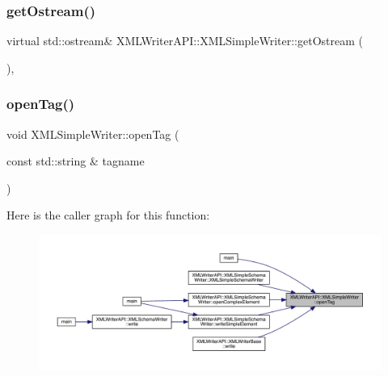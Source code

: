 \subsubsection{\texorpdfstring{getOstream()}{getOstream()}\hspace{0.1cm}{\footnotesize\ttfamily [2/2]}}
{\footnotesize\ttfamily virtual std\+::ostream\& X\+M\+L\+Writer\+A\+P\+I\+::\+X\+M\+L\+Simple\+Writer\+::get\+Ostream (\begin{DoxyParamCaption}{ }\end{DoxyParamCaption})\hspace{0.3cm}{\ttfamily [protected]}, {}}

\mbox{\label{classXMLWriterAPI_1_1XMLSimpleWriter_ac3033f799bbe8ba59bfba4f8c22a2e79}} 
\subsubsection{\texorpdfstring{openTag()}{openTag()}\hspace{0.1cm}{\footnotesize\ttfamily [1/8]}}
{\footnotesize\ttfamily void X\+M\+L\+Simple\+Writer\+::open\+Tag (\begin{DoxyParamCaption}\item[{const std\+::string \&}]{tagname }\end{DoxyParamCaption})}

Here is the caller graph for this function\+:\nopagebreak
\begin{figure}[H]
\begin{center}
\leavevmode
\includegraphics[width=350pt]{d5/de1/classXMLWriterAPI_1_1XMLSimpleWriter_ac3033f799bbe8ba59bfba4f8c22a2e79_icgraph}
\end{center}
\end{figure}
\mbox{\label{classXMLWriterAPI_1_1XMLSimpleWriter_aaddd3b55ffc11672fef8ce464f2882c4}} 

